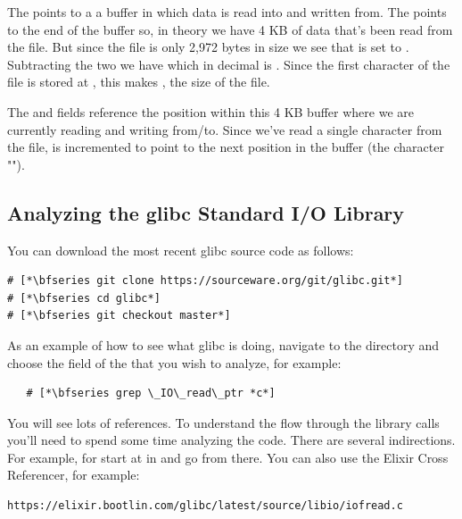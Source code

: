 The  points to a a buffer in which data is read into and written from. The  points to the end of the buffer so, in theory we have 4 KB of data that's been read from the file. But since the file is only 2,972 bytes in size we see that  is set to . Subtracting the two we have  which in decimal is . Since the first character of the file is stored at , this makes , the size of the file.

The  and  fields reference the position within this 4 KB buffer where we are currently reading and writing from/to. Since we've read a single character from the file,  is incremented to point to the next position in the buffer (the character "").


\subsection{Analyzing the glibc Standard I/O Library}

You can download the most recent glibc source code as follows:

\begin{lstlisting}
# [*\bfseries git clone https://sourceware.org/git/glibc.git*]
# [*\bfseries cd glibc*]
# [*\bfseries git checkout master*]
\end{lstlisting}

\noindent
As an example of how to see what glibc is doing, navigate to the  directory and choose the field of the  that you wish to analyze, for example:

\begin{lstlisting}
   # [*\bfseries grep \_IO\_read\_ptr *c*]
\end{lstlisting}

\noindent
You will see lots of references. To understand the flow through the library calls you'll need to spend some time analyzing the code. There are several indirections. For example, for  start at  in  and go from there. You can also use the Elixir Cross Referencer, for example:

\begin{lstlisting}
https://elixir.bootlin.com/glibc/latest/source/libio/iofread.c
\end{lstlisting}

